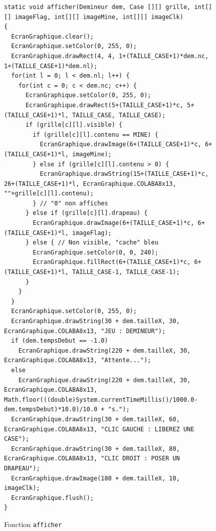 \documentclass[a4paper, 12pt, oneside]{article}
\newcommand{\var}[1]{\texttt{#1}}
\begin{document}
\begin{figure}[hpt]
	\center
	\caption{\label{fig:fnAfficher} Fonction \var{afficher}}
\begin{lstlisting}
static void afficher(Demineur dem, Case [][] grille, int[][] imageFlag, int[][] imageMine, int[][] imageClk)
{
  EcranGraphique.clear();
  EcranGraphique.setColor(0, 255, 0);
  EcranGraphique.drawRect(4, 4, 1+(TAILLE_CASE+1)*dem.nc, 1+(TAILLE_CASE+1)*dem.nl);
  for(int l = 0; l < dem.nl; l++) {
    for(int c = 0; c < dem.nc; c++) {
      EcranGraphique.setColor(0, 255, 0);
      EcranGraphique.drawRect(5+(TAILLE_CASE+1)*c, 5+(TAILLE_CASE+1)*l, TAILLE_CASE, TAILLE_CASE);
      if (grille[c][l].visible) {
        if (grille[c][l].contenu == MINE) {
          EcranGraphique.drawImage(6+(TAILLE_CASE+1)*c, 6+(TAILLE_CASE+1)*l, imageMine);
        } else if (grille[c][l].contenu > 0) {
          EcranGraphique.drawString(15+(TAILLE_CASE+1)*c, 26+(TAILLE_CASE+1)*l, EcranGraphique.COLABA8x13, ""+grille[c][l].contenu);
        } // "0" non affiches
      } else if (grille[c][l].drapeau) {
        EcranGraphique.drawImage(6+(TAILLE_CASE+1)*c, 6+(TAILLE_CASE+1)*l, imageFlag);
      } else { // Non visible, "cache" bleu
        EcranGraphique.setColor(0, 0, 240);
        EcranGraphique.fillRect(6+(TAILLE_CASE+1)*c, 6+(TAILLE_CASE+1)*l, TAILLE_CASE-1, TAILLE_CASE-1);
      }
    }
  }
  EcranGraphique.setColor(0, 255, 0);
  EcranGraphique.drawString(30 + dem.tailleX, 30, EcranGraphique.COLABA8x13, "JEU : DEMINEUR");
  if (dem.tempsDebut == -1.0)
    EcranGraphique.drawString(220 + dem.tailleX, 30, EcranGraphique.COLABA8x13, "Attente...");
  else
    EcranGraphique.drawString(220 + dem.tailleX, 30, EcranGraphique.COLABA8x13, Math.floor(((double)System.currentTimeMillis()/1000.0-dem.tempsDebut)*10.0)/10.0 + "s.");
  EcranGraphique.drawString(30 + dem.tailleX, 60, EcranGraphique.COLABA8x13, "CLIC GAUCHE : LIBEREZ UNE CASE");
  EcranGraphique.drawString(30 + dem.tailleX, 80, EcranGraphique.COLABA8x13, "CLIC DROIT : POSER UN DRAPEAU");
  EcranGraphique.drawImage(180 + dem.tailleX, 10, imageClk);
  EcranGraphique.flush();
}
\end{lstlisting}
\end{figure}
\end{document}
